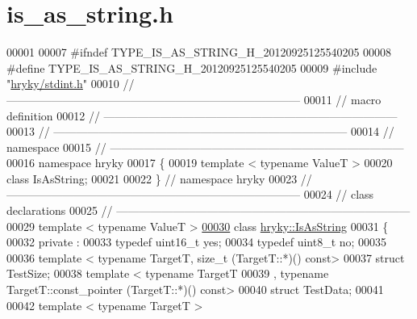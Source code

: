 \hypertarget{is__as__string_8h_source}{\section{is\-\_\-as\-\_\-string.\-h}
}

\begin{DoxyCode}
00001 
00007 \textcolor{preprocessor}{#ifndef TYPE\_IS\_AS\_STRING\_H\_20120925125540205}
00008 \textcolor{preprocessor}{}\textcolor{preprocessor}{#define TYPE\_IS\_AS\_STRING\_H\_20120925125540205}
00009 \textcolor{preprocessor}{}\textcolor{preprocessor}{#include "\hyperlink{stdint_8h}{hryky/stdint.h}"}
00010 \textcolor{comment}{//
      ------------------------------------------------------------------------------}
00011 \textcolor{comment}{// macro definition}
00012 \textcolor{comment}{//
      ------------------------------------------------------------------------------}
00013 \textcolor{comment}{//
      ------------------------------------------------------------------------------}
00014 \textcolor{comment}{// namespace}
00015 \textcolor{comment}{//
      ------------------------------------------------------------------------------}
00016 \textcolor{keyword}{namespace }hryky
00017 \{
00019     \textcolor{keyword}{template} < \textcolor{keyword}{typename} ValueT >
00020     \textcolor{keyword}{class }IsAsString;
00021 
00022 \} \textcolor{comment}{// namespace hryky}
00023 \textcolor{comment}{//
      ------------------------------------------------------------------------------}
00024 \textcolor{comment}{// class declarations}
00025 \textcolor{comment}{//
      ------------------------------------------------------------------------------}
00029 \textcolor{comment}{}\textcolor{keyword}{template} < \textcolor{keyword}{typename} ValueT >
\hypertarget{is__as__string_8h_source_l00030}{}\hyperlink{classhryky_1_1_is_as_string}{00030} \textcolor{keyword}{class }\hyperlink{classhryky_1_1_is_as_string}{hryky::IsAsString}
00031 \{
00032 \textcolor{keyword}{private} :
00033     \textcolor{keyword}{typedef} uint16\_t    yes;
00034     \textcolor{keyword}{typedef} uint8\_t     no;
00035 
00036     \textcolor{keyword}{template} < \textcolor{keyword}{typename} TargetT, \textcolor{keywordtype}{size\_t} (TargetT::*)() const>
00037         \textcolor{keyword}{struct }TestSize;
00038     \textcolor{keyword}{template} < \textcolor{keyword}{typename} TargetT
00039         , \textcolor{keyword}{typename} TargetT::const\_pointer (TargetT::*)() \textcolor{keyword}{const}>
00040         \textcolor{keyword}{struct} TestData;
00041     
00042     \textcolor{keyword}{template} < \textcolor{keyword}{typename} TargetT >

\end{DoxyCode}
